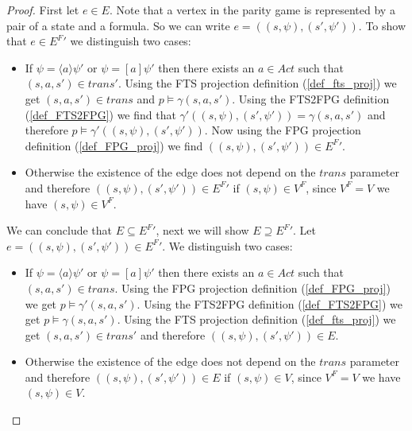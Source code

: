 \begin{theorem}
\begin{proof}
		First let $e \in E$. Note that a vertex in the parity game is represented by a pair of a state and a formula. So we can write $e = ((s,\psi),(s',\psi'))$. To show that $e \in {E^F}'$ we distinguish two cases:
		\begin{itemize}
			\item  If $\psi = \langle a \rangle \psi'$ or $\psi = [a] \psi'$ then there exists an $a \in Act$ such that $(s,a,s') \in trans'$. Using the FTS projection definition (\ref{def_fts_proj}) we get $(s,a,s') \in trans$ and $p \models \gamma(s,a,s')$. Using the FTS2FPG definition (\ref{def_FTS2FPG}) we find that $\gamma'((s,\psi),(s',\psi')) = \gamma(s,a,s')$ and therefore $p \models \gamma'((s,\psi),(s',\psi'))$. Now using the FPG projection definition (\ref{def_FPG_proj}) we find $((s,\psi),(s',\psi')) \in {E^F}'$.
			\item Otherwise the existence of the edge does not depend on the $trans$ parameter and therefore $((s,\psi),(s',\psi')) \in {E^F}'$ if $(s,\psi) \in V^F$, since $V^F = V$ we have $(s,\psi) \in V^F$.
		\end{itemize}
		We can conclude that $E \subseteq {E^F}'$, next we will show $E \supseteq {E^F}'$. Let $e = ((s,\psi),(s',\psi')) \in {E^F}'$. We distinguish two cases:
		\begin{itemize}
			\item If $\psi = \langle a \rangle \psi'$ or $\psi = [a] \psi'$ then there exists an $a \in Act$ such that $(s,a,s') \in trans$. Using the FPG projection definition (\ref{def_FPG_proj}) we get $p \models \gamma'(s,a,s')$. Using the FTS2FPG definition (\ref{def_FTS2FPG}) we get $p \models \gamma(s,a,s')$. Using the FTS projection definition (\ref{def_fts_proj}) we get $(s,a,s') \in trans'$ and therefore $((s,\psi),(s',\psi'))\in E$.
			\item Otherwise the existence of the edge does not depend on the $trans$ parameter and therefore $((s,\psi),(s',\psi')) \in E$ if $(s,\psi) \in V$, since $V^F = V$ we have $(s,\psi) \in V$.
		\end{itemize}
	\end{proof}
\end{theorem}

